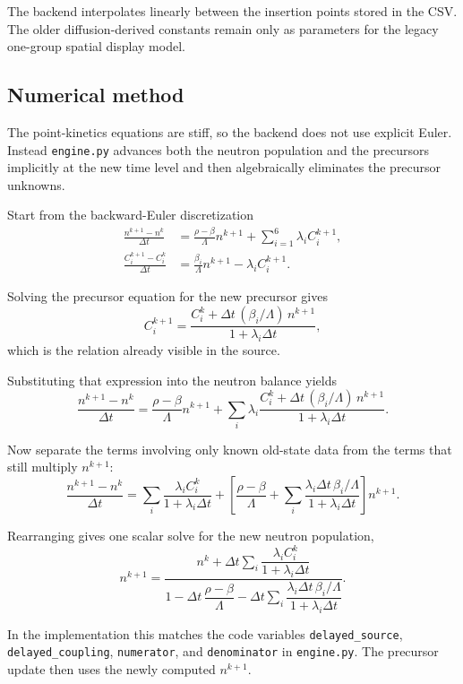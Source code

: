 \documentclass[11pt]{article}
\begin{document}
The backend interpolates linearly between the insertion points stored in the
CSV.  The older diffusion-derived constants remain only as parameters for the
legacy one-group spatial display model.

\subsection{Numerical method}

The point-kinetics equations are stiff, so the backend does not use explicit
Euler.  Instead \texttt{engine.py} advances both the neutron population and the
precursors implicitly at the new time level and then algebraically eliminates
the precursor unknowns.

Start from the backward-Euler discretization
\begin{align}
\frac{n^{k+1} - n^k}{\Delta t}
&=
\frac{\rho-\beta}{\Lambda} n^{k+1}
+ \sum_{i=1}^6 \lambda_i C_i^{k+1},
\\
\frac{C_i^{k+1} - C_i^k}{\Delta t}
&=
\frac{\beta_i}{\Lambda} n^{k+1} - \lambda_i C_i^{k+1}.
\end{align}

Solving the precursor equation for the new precursor gives
\[
C_i^{k+1}
=
\frac{C_i^k + \Delta t\,(\beta_i/\Lambda)\,n^{k+1}}
{1 + \lambda_i \Delta t},
\]
which is the relation already visible in the source.

Substituting that expression into the neutron balance yields
\[
\frac{n^{k+1} - n^k}{\Delta t}
=
\frac{\rho-\beta}{\Lambda} n^{k+1}
+ \sum_i \lambda_i
\frac{C_i^k + \Delta t\,(\beta_i/\Lambda)\,n^{k+1}}
{1+\lambda_i\Delta t}.
\]

Now separate the terms involving only known old-state data from the terms that
still multiply $n^{k+1}$:
\[
\frac{n^{k+1} - n^k}{\Delta t}
=
\sum_i \frac{\lambda_i C_i^k}{1+\lambda_i\Delta t}
+
\left[
\frac{\rho-\beta}{\Lambda}
+ \sum_i \frac{\lambda_i \Delta t\,\beta_i/\Lambda}{1+\lambda_i\Delta t}
\right] n^{k+1}.
\]

Rearranging gives one scalar solve for the new neutron population,
\[
n^{k+1}
=
\frac{n^k + \Delta t\sum_i \dfrac{\lambda_i C_i^k}{1+\lambda_i\Delta t}}
{1 - \Delta t\,\dfrac{\rho-\beta}{\Lambda}
 - \Delta t\sum_i
   \dfrac{\lambda_i \Delta t\,\beta_i/\Lambda}{1+\lambda_i\Delta t}}.
\]

In the implementation this matches the code variables
\texttt{delayed\_source}, \texttt{delayed\_coupling}, \texttt{numerator}, and
\texttt{denominator} in \texttt{engine.py}.  The precursor update then uses the
newly computed $n^{k+1}$.
\end{document}
